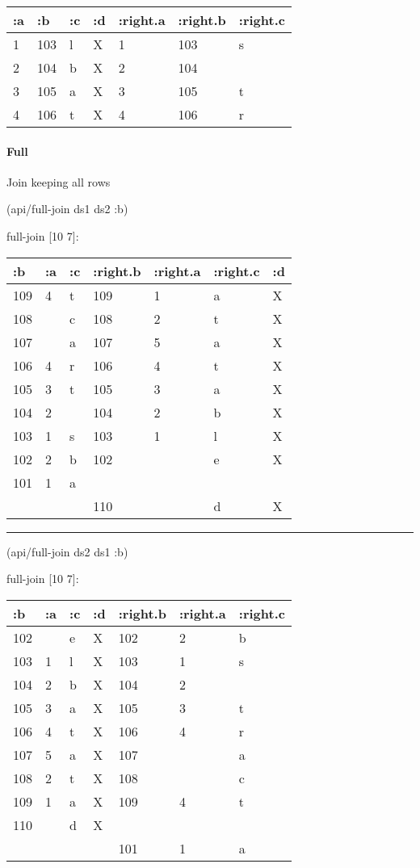 \documentclass[]{article}
\newenvironment{Shaded}{\begin{snugshade}}{\end{snugshade}}
\newcommand{\AttributeTok}[1]{\textcolor[rgb]{0.77,0.63,0.00}{#1}}
\newcommand{\NormalTok}[1]{#1}
\let\oldparagraph\paragraph
\renewcommand{\paragraph}[1]{\oldparagraph{#1}\mbox{}}
\begin{document}
\begin{longtable}[]{@{}lllllll@{}}
\toprule
:a & :b & :c & :d & :right.a & :right.b & :right.c\tabularnewline
\midrule
\endhead
1 & 103 & l & X & 1 & 103 & s\tabularnewline
2 & 104 & b & X & 2 & 104 &\tabularnewline
3 & 105 & a & X & 3 & 105 & t\tabularnewline
4 & 106 & t & X & 4 & 106 & r\tabularnewline
\bottomrule
\end{longtable}

\paragraph{Full}\label{full}

Join keeping all rows

\begin{Shaded}
\begin{Highlighting}[]
\NormalTok{(api/full-join ds1 ds2 }\AttributeTok{:b}\NormalTok{)}
\end{Highlighting}
\end{Shaded}

full-join {[}10 7{]}:

\begin{longtable}[]{@{}lllllll@{}}
\toprule
:b & :a & :c & :right.b & :right.a & :right.c & :d\tabularnewline
\midrule
\endhead
109 & 4 & t & 109 & 1 & a & X\tabularnewline
108 & & c & 108 & 2 & t & X\tabularnewline
107 & & a & 107 & 5 & a & X\tabularnewline
106 & 4 & r & 106 & 4 & t & X\tabularnewline
105 & 3 & t & 105 & 3 & a & X\tabularnewline
104 & 2 & & 104 & 2 & b & X\tabularnewline
103 & 1 & s & 103 & 1 & l & X\tabularnewline
102 & 2 & b & 102 & & e & X\tabularnewline
101 & 1 & a & & & &\tabularnewline
& & & 110 & & d & X\tabularnewline
\bottomrule
\end{longtable}

\begin{center}\rule{0.5\linewidth}{0.5pt}\end{center}

\begin{Shaded}
\begin{Highlighting}[]
\NormalTok{(api/full-join ds2 ds1 }\AttributeTok{:b}\NormalTok{)}
\end{Highlighting}
\end{Shaded}

full-join {[}10 7{]}:

\begin{longtable}[]{@{}lllllll@{}}
\toprule
:b & :a & :c & :d & :right.b & :right.a & :right.c\tabularnewline
\midrule
\endhead
102 & & e & X & 102 & 2 & b\tabularnewline
103 & 1 & l & X & 103 & 1 & s\tabularnewline
104 & 2 & b & X & 104 & 2 &\tabularnewline
105 & 3 & a & X & 105 & 3 & t\tabularnewline
106 & 4 & t & X & 106 & 4 & r\tabularnewline
107 & 5 & a & X & 107 & & a\tabularnewline
108 & 2 & t & X & 108 & & c\tabularnewline
109 & 1 & a & X & 109 & 4 & t\tabularnewline
110 & & d & X & & &\tabularnewline
& & & & 101 & 1 & a\tabularnewline
\bottomrule
\end{longtable}
\end{document}
